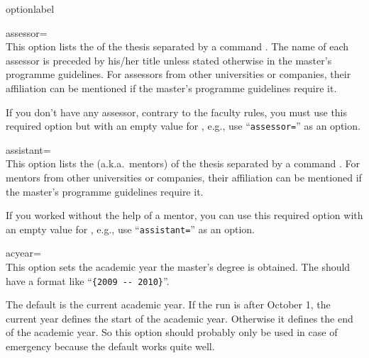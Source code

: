 \begin{labelled}{optionlabel}
\item[assessor=\meta{assessors}]
  \\
  This option lists the  of the thesis separated by a command
  . The name of each assessor is preceded by his/her title unless
  stated otherwise in the master's programme guidelines. For assessors from
  other universities or companies, their affiliation can be mentioned if the
  master's programme guidelines require it.

   If you don't have any assessor, contrary to the
  faculty rules, you must use this required option but with an empty value
  for , e.g., use ``\verb"assessor="'' as an option.

\item[assistant=\meta{assistants}]
  \\
  This option lists the  (a.k.a.\ mentors) of the thesis
  separated by a command . For mentors from other universities or
  companies, their affiliation can be mentioned if the master's programme
  guidelines require it.

   If you worked without the help of a mentor, you can
  use this required option with an empty value for , e.g.,
  use ``\verb"assistant="'' as an option.

\item[acyear=\meta{acyear}]\\
  This option sets the academic year the master's degree is obtained. The
   should have a format like ``\verb*"{2009 -- 2010}"''.

  The default is the current academic year. If the  run is
  after October 1, the current year defines the start of the academic year.
  Otherwise it defines the end of the academic year. So this option should
  probably only be used in case of emergency because the default works quite
  well.
\end{labelled}

